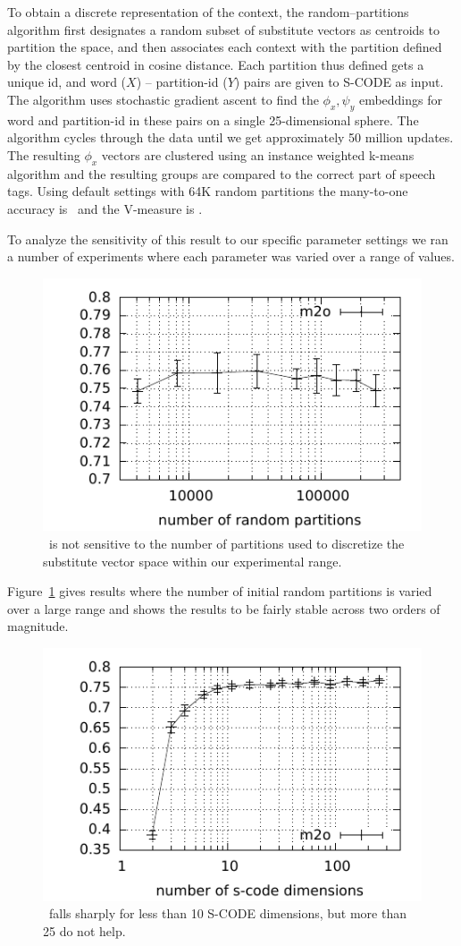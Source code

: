 To obtain a discrete representation of the context, the
random--partitions algorithm first designates a random subset of
substitute vectors as centroids to partition the space, and then
associates each context with the partition defined by the closest
centroid in cosine distance.  Each partition thus defined gets a
unique id, and word ($X$) -- partition-id ($Y$) pairs are given to
S-CODE as input.  The algorithm uses stochastic gradient ascent to
find the $\phi_x, \psi_y$ embeddings for word and partition-id in
these pairs on a single 25-dimensional sphere.  The algorithm cycles
through the data until we get approximately 50 million updates.  The
resulting $\phi_x$ vectors are clustered using an instance weighted
k-means algorithm and the resulting groups are compared to the correct
part of speech tags.  Using default settings with 64K random
partitions the many-to-one accuracy is \rpmto\ and the V-measure is
\rpvm.

To analyze the sensitivity of this result to our specific parameter
settings we ran a number of experiments where each parameter was
varied over a range of values.

\begin{figure}[ht] \centering
\includegraphics[width=0.5\linewidth]{plot-p.pdf}
\caption{\mto\ is not sensitive to the number of partitions used to
  discretize the substitute vector space within our experimental
  range.}
\label{plot-p}
\end{figure}

Figure~\ref{plot-p} gives results where the number of initial random
partitions is varied over a large range and shows the results to be
fairly stable across two orders of magnitude.

\begin{figure}[ht] \centering
\includegraphics[width=0.5\linewidth]{plot-d.pdf}
\caption{\mto\ falls sharply for less than 10 S-CODE dimensions, but
  more than 25 do not help.}
\label{plot-d}
\end{figure}

